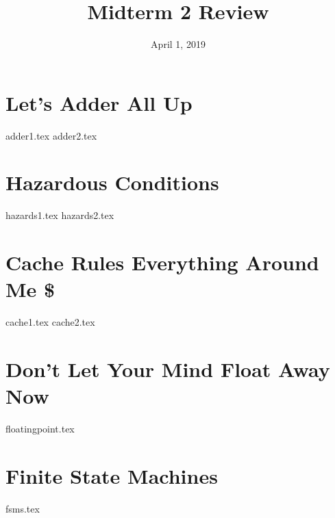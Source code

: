 \documentclass[11pt]{exam}
\title{Midterm 2 Review}
\date{April 1, 2019}
\begin{document}
\maketitle

\section{Let’s Adder All Up}
\begin{questions}
{adder1.tex}
{adder2.tex}
\end{questions}
\newpage

\section{Hazardous Conditions}
\begin{questions}
{hazards1.tex}
{hazards2.tex}
\end{questions}
\newpage

\section{Cache Rules Everything Around Me \$}
\begin{questions}
{cache1.tex}
{cache2.tex}
\end{questions}
\newpage

\section{Don’t Let Your Mind Float Away Now}
\begin{questions}
{floatingpoint.tex}
\end{questions}
\newpage

\section{Finite State Machines}
\begin{questions}
{fsms.tex}
\end{questions}
\newpage
\end{document}
